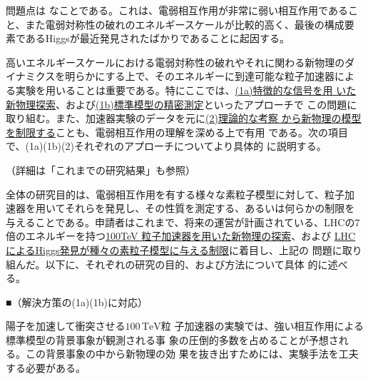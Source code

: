 \documentclass[11pt,a4paper,twoside,dvipdfmx]{jarticle}		%
\newcommand{\研究課題名}{粒子加速器を用いた電弱相互作用を持つ新物理の探索}
\newcommand{\研究機関名}{東京大学}
\newcommand{\申請者氏名}{千草颯}
\newcommand{\研究代表者氏名}{\申請者氏名}
\newcommand{\研究期間の最終元号年度}{34}	%
\begin{document}
{問題点は  なことである。これは、電弱相互作用が非常に弱い相互作用であるこ
と、また電弱対称性の破れのエネルギースケールが比較的高く、最後の構成要
素であるHiggsが最近発見されたばかりであることに起因する。

\vspace*{1mm}

高いエネルギースケールにおける電弱対称性の破れやそれに関わる新物理のダ
イナミクスを明らかにする上で、そのエネルギーに到達可能な粒子加速器によ
る実験を用いることは重要である。特にここでは、\ul{(1a)特徴的な信号を用
いた新物理探索}、および\ul{(1b)標準模型の精密測定}といったアプローチで
この問題に取り組む。また、加速器実験のデータを元に\ul{(2)理論的な考察
から新物理の模型を制限する}ことも、電弱相互作用の理解を深める上で有用
である。次の項目で、(1a)(1b)(2)それぞれのアプローチについてより具体的
に説明する。

\vspace*{1mm}

（詳細は「これまでの研究結果」も参照）

\vspace*{1mm}

全体の研究目的は、電弱相互作用を有する様々な素粒子模型に対して、粒子加
速器を用いてそれらを発見し、その性質を測定する、あるいは何らかの制限を
与えることである。申請者はこれまで、将来の運営が計画されている、LHCの7
倍のエネルギーを持つ\ul{100TeV 粒子加速器を用いた新物理の探索}、および
\ul{LHCによるHiggs発見が種々の素粒子模型に与える制限}に着目し、上記の
問題に取り組んだ。以下に、それぞれの研究の目的、および方法について具体
的に述べる。

\vspace*{1mm}

■（解決方策の(1a)(1b)に対応）

\vspace*{1mm}

陽子を加速して衝突させる$100\,\mathrm{TeV}$粒
子加速器の実験では、強い相互作用による標準模型の背景事象が観測される事
象の圧倒的多数を占めることが予想される。この背景事象の中から新物理の効
果を抜き出すためには、実験手法を工夫する必要がある。

}
\end{document}
